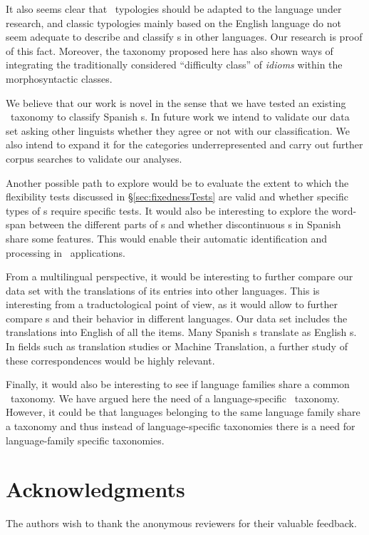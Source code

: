 \documentclass[output=paper]{langsci/langscibook}
\begin{document}
It also seems clear that \mwe\ typologies should be adapted to the language under research, and classic typologies mainly based on the English language do not seem adequate to describe and classify \mwe s in other languages.
Our research is proof of this fact.
Moreover, the taxonomy proposed here has also shown ways of integrating the traditionally considered ``difficulty class'' of \textit{idioms} within the morphosyntactic classes.

We believe that our work is novel in the sense that we have tested an existing \mwe\ taxonomy to classify Spanish \mwe s.
In future work we intend to validate our data set asking other linguists whether they agree or not with our classification.
We also intend to expand it for the categories underrepresented and carry out further corpus searches to validate our analyses.

Another possible path to explore would be to evaluate the extent to which the flexibility tests discussed in §\ref{sec:fixednessTests} are valid and whether specific types of \mwe s require specific tests.
It would also be interesting to explore the word-span between the different parts of \mwe s and whether discontinuous \mwe s in Spanish share some features.
This would enable their automatic identification and processing in \nlp\ applications.

From a multilingual perspective, it would be interesting to further compare our data set with the translations of its entries into other languages.
This is interesting from a traductological point of view, as it would allow to further compare \mwe s and their behavior in different languages.
Our data set includes the translations into English of all the items.
Many Spanish \mwe s translate as English \mwe s.
In fields such as translation studies or Machine Translation, a further study of these correspondences would be highly relevant.

Finally, it would also be interesting to see if language families share a common \mwe\ taxonomy.
We have argued here the need of a language-specific \mwe\ taxonomy.
However, it could be that languages belonging to the same language family share a taxonomy and thus instead of language-specific taxonomies there is a need for language-family specific taxonomies.

\section*{Acknowledgments}
The authors wish to thank the anonymous reviewers for their valuable feedback.
\end{document}
